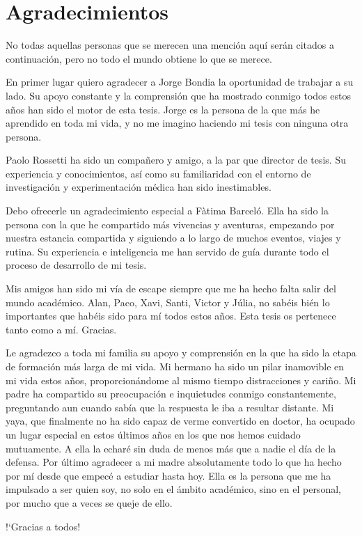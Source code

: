 \chapter*{Agradecimientos}
\label{sec:ack}

No todas aquellas personas que se merecen una menci\'{o}n aqu\'{i} ser\'{a}n citados a continuaci\'{o}n, pero no todo el mundo obtiene lo que se merece.

En primer lugar quiero agradecer a Jorge Bondia la oportunidad de trabajar a su lado. Su apoyo constante y la comprensi\'{o}n que ha mostrado conmigo todos estos a\~{n}os han sido el motor de esta tesis. Jorge es la persona de la que m\'{a}s he aprendido en toda mi vida, y no me imagino haciendo mi tesis con ninguna otra persona.

Paolo Rossetti ha sido un compa\~{n}ero y amigo, a la par que director de tesis. Su experiencia y conocimientos, as\'{i} como su familiaridad con el entorno de investigaci\'{o}n y experimentaci\'{o}n m\'{e}dica han sido inestimables.


Debo ofrecerle un agradecimiento especial a F\`{a}tima Barcel\'{o}. Ella ha sido la persona con la que he compartido m\'{a}s vivencias y aventuras, empezando por nuestra estancia compartida y siguiendo a lo largo de muchos eventos, viajes y rutina. Su experiencia e inteligencia me han servido de gu\'{i}a durante todo el proceso de desarrollo de mi tesis.%

Mis amigos han sido mi v\'{i}a de escape siempre que me ha hecho falta salir del mundo acad\'{e}mico. Alan, Paco, Xavi, Santi, Victor y J\'{u}lia, no sab\'{e}is bi\'{e}n lo importantes que hab\'{e}is sido para m\'{i} todos estos a\~{n}os. Esta tesis os pertenece tanto como a m\'{i}. Gracias.

Le agradezco a toda mi familia su apoyo y comprensi\'{o}n en la que ha sido la etapa de formaci\'{o}n m\'{a}s larga de mi vida. Mi hermano ha sido un pilar inamovible en mi vida estos a\~{n}os, proporcion\'{a}ndome al mismo tiempo distracciones y cari\~{n}o. Mi padre ha compartido su preocupaci\'{o}n e inquietudes conmigo constantemente, preguntando aun cuando sab\'{i}a que la respuesta le iba a resultar distante. Mi yaya, que finalmente no ha sido capaz de verme convertido en doctor, ha ocupado un lugar especial en estos \'{u}ltimos a\~{n}os en los que nos hemos cuidado mutuamente. A ella la echar\'{e} sin duda de menos m\'{a}s que a nadie el d\'{i}a de la defensa. Por \'{u}ltimo agradecer a mi madre absolutamente todo lo que ha hecho por m\'{i} desde que empec\'{e} a estudiar hasta hoy. Ella es la persona que me ha impulsado a ser quien soy, no solo en el \'{a}mbito acad\'{e}mico, sino en el personal, por mucho que a veces se queje de ello.

!`Gracias a todos!
